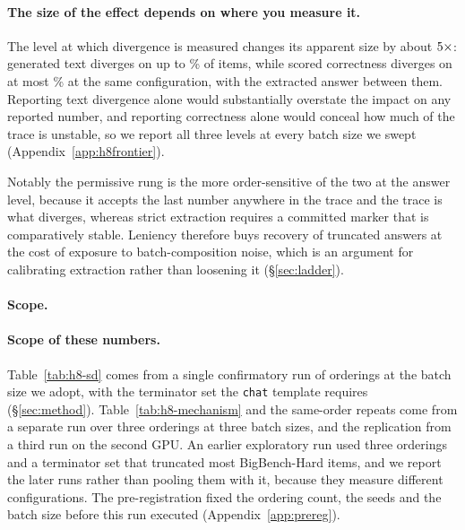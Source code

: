 \documentclass[conference]{IEEEtran}
\begin{document}
\paragraph{The size of the effect depends on where you measure it.}
The level at which divergence is measured changes its apparent size by about
$5\times$: generated text diverges on up to
\hEightWorstText\% of items, while scored correctness diverges on at most
\hEightWorstCorr\% at the same configuration, with the extracted answer between
them. Reporting text divergence alone would substantially overstate the impact on
any reported number, and reporting correctness alone would conceal how much of the
trace is unstable, so we report all three levels at every batch size we swept
(Appendix~\ref{app:h8frontier}).

Notably the permissive rung is the more order-sensitive of the two at the
answer level, because it accepts the last number anywhere in the trace and the
trace is what diverges, whereas strict extraction requires a committed marker
that is comparatively stable. Leniency therefore buys recovery of truncated
answers at the cost of exposure to batch-composition noise, which is an
argument for calibrating extraction rather than loosening it
(\S\ref{sec:ladder}).

\paragraph{Scope.}
\paragraph{Scope of these numbers.}
Table~\ref{tab:h8-sd} comes from a single confirmatory run of
\hEightSDOrderings{} orderings at the batch size we adopt, with the terminator set the
\texttt{chat} template requires (\S\ref{sec:method}). Table~\ref{tab:h8-mechanism} and the
same-order repeats come from a separate run over three orderings at three batch sizes, and
the replication from a third run on the second GPU. An earlier exploratory run used
three orderings and a terminator set that truncated most BigBench-Hard items, and we
report the later runs rather than pooling them with it, because they measure different
configurations. The pre-registration fixed the ordering count, the seeds and the batch
size before this run executed (Appendix~\ref{app:prereg}).
\end{document}
